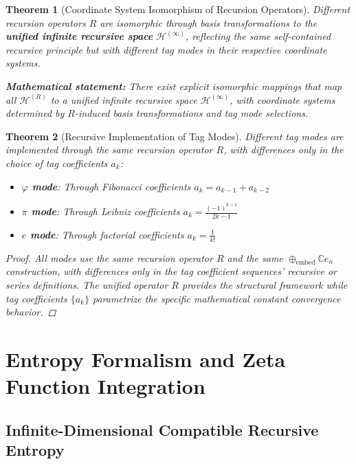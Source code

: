 \documentclass[12pt]{article}
\theoremstyle{plain}
\newtheorem{theorem}{Theorem}[section]
\theoremstyle{definition}
\begin{document}
\begin{theorem}[Coordinate System Isomorphism of Recursion Operators]
\label{thm:coordinate-isomorphism}
Different recursion operators $R$ are isomorphic through basis transformations to the \textbf{unified infinite recursive space} $\mathcal{H}^{(\infty)}$, reflecting the same self-contained recursive principle but with different tag modes in their respective coordinate systems.

\textbf{Mathematical statement:} There exist explicit isomorphic mappings that map all $\mathcal{H}^{(R)}$ to a unified infinite recursive space $\mathcal{H}^{(\infty)}$, with coordinate systems determined by $R$-induced basis transformations and tag mode selections.
\end{theorem}

\begin{theorem}[Recursive Implementation of Tag Modes]
\label{thm:recursive-tag-modes}
Different tag modes are implemented through the same recursion operator $R$, with differences only in the choice of tag coefficients $a_k$:
\begin{itemize}
\item \textbf{$\varphi$ mode}: Through Fibonacci coefficients $a_k = a_{k-1} + a_{k-2}$
\item \textbf{$\pi$ mode}: Through Leibniz coefficients $a_k = \frac{(-1)^{k-1}}{2k-1}$
\item \textbf{$e$ mode}: Through factorial coefficients $a_k = \frac{1}{k!}$
\end{itemize}

\begin{proof}
All modes use the same recursion operator $R$ and the same $\oplus_{\text{embed}} \mathbb{C} e_n$ construction, with differences only in the tag coefficient sequences' recursive or series definitions. The unified operator $R$ provides the structural framework while tag coefficients $\{a_k\}$ parametrize the specific mathematical constant convergence behavior.
\end{proof}
\end{theorem}

\section{Entropy Formalism and Zeta Function Integration}

\subsection{Infinite-Dimensional Compatible Recursive Entropy}
\end{document}
